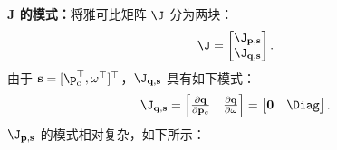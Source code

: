 \textbf{$\mathbf{J}$ 的模式：}将雅可比矩阵 $\J$ 分为两块：
\begin{equation}
  \J =
  \begin{bmatrix}
    \J_{\mathbf{p, s}} \\
    \J_{\mathbf{q, s}}
  \end{bmatrix}.
\end{equation}
由于 $\mathbf s=[\p_{\text{c}}^\top, \mathbf{\omega}^\top]^\top$，$\J_{\mathbf{q, s}}$ 具有如下模式：
\begin{equation}
  \J_{\mathbf{q, s}} =
  \begin{bmatrix}
    \frac{\partial \mathbf{q}}{\partial \mathbf{p}_{c}} & \frac{\partial \mathbf{q}}{\partial \mathbf{\omega}}
  \end{bmatrix} =
  \begin{bmatrix}
    \mathbf{0} & \Diag
  \end{bmatrix}.
  \label{eq:Jqs_pattern}
\end{equation}
$\J_{\mathbf{p, s}}$ 的模式相对复杂，如下所示：
